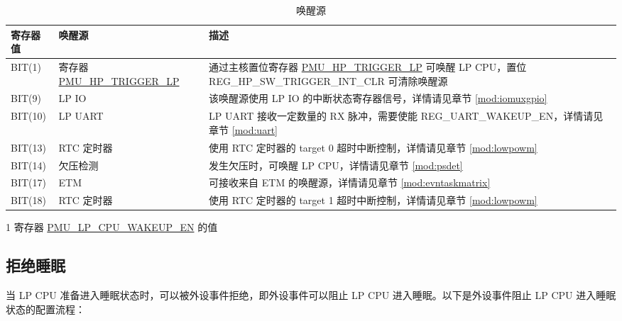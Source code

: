 \documentclass[main\_\_CN.tex]{subfiles}
\begin{document}
    \begin{table}[H]
    \centering
    \caption{唤醒源}
    \label{tab:ulp-wake-sources}
    \begin{threeparttable}
    \begin{tabular}{| l | l | m{9cm}|}
    \hline
    \rowcolor{lightgray}
    寄存器值\tnote{1} & 唤醒源 & 描述  \\\hline
    BIT(1) & 寄存器 \hyperref[fielddesc:PMUHPTRIGGERLP]{PMU\_HP\_TRIGGER\_LP} & 通过主核置位寄存器 \hyperref[fielddesc:PMUHPTRIGGERLP]{PMU\_HP\_TRIGGER\_LP} 可唤醒 LP CPU，置位 REG\_HP\_SW\_TRIGGER\_INT\_CLR 可清除唤醒源\\\hline
    BIT(9) & LP IO & 该唤醒源使用 LP IO 的中断状态寄存器信号，详情请见章节  \ref{mod:iomuxgpio} \textit{\nameref{mod:iomuxgpio}} \\\hline
    BIT(10) & LP UART & LP UART 接收一定数量的 RX 脉冲，需要使能 REG\_UART\_WAKEUP\_EN，详情请见章节 \ref{mod:uart} \textit{\nameref{mod:uart}} \\\hline
    BIT(13) & RTC 定时器 & 使用 RTC 定时器的 target 0 超时中断控制，详情请见章节 \ref{mod:lowpowm} \textit{\nameref{mod:lowpowm}} \\\hline
    BIT(14) & 欠压检测 & 发生欠压时，可唤醒 LP CPU，详情请见章节 \ref{mod:psdet} \textit{\nameref{mod:psdet}} \\\hline
    BIT(17) & ETM & 可接收来自 ETM 的唤醒源，详情请见章节 \ref{mod:evntaskmatrix} \textit{\nameref{mod:evntaskmatrix}} \\\hline
    BIT(18) & RTC 定时器 & 使用 RTC 定时器的 target 1 超时中断控制，详情请见章节 \ref{mod:lowpowm} \textit{\nameref{mod:lowpowm}} \\\hline


\end{tabular}
    \begin{tablenotes}
        \item[1] 寄存器 \hyperref[fielddesc:PMULPCPUWAKEUPEN]{PMU\_LP\_CPU\_WAKEUP\_EN} 的值
    \end{tablenotes}
    \end{threeparttable}
\end{table}

\subsection{拒绝睡眠}

当 LP CPU 准备进入睡眠状态时，可以被外设事件拒绝，即外设事件可以阻止 LP CPU 进入睡眠。以下是外设事件阻止 LP CPU 进入睡眠状态的配置流程：
\end{document}
